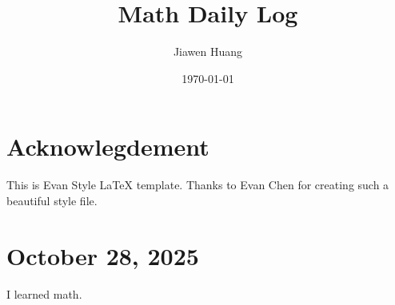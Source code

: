 \documentclass[15pt]{scrartcl}
\begin{document}
\title{Math Daily Log}
\date{\today}
\author{Jiawen Huang}
\maketitle
\section*{Acknowlegdement}
This is Evan Style LaTeX template. Thanks to Evan Chen for creating such a beautiful style file.
\section*{October 28, 2025}

I learned math. 
\end{document}
